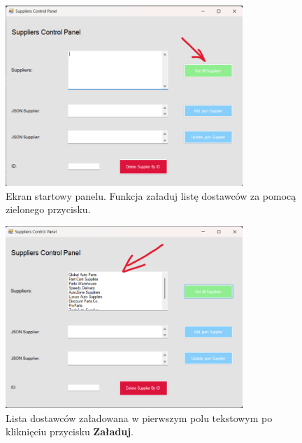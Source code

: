 \begin{figure}[h!]
    \centering
    \includegraphics[width=0.8\textwidth]{img_tests/suppliers_test_1.png}
    \caption{Ekran startowy panelu. Funkcja załaduj listę dostawców za pomocą zielonego przycisku.}
    \label{fig:suppliers_test_1}
\end{figure}

\begin{figure}[h!]
    \centering
    \includegraphics[width=0.8\textwidth]{img_tests/suppliers_test_2.png}
    \caption{Lista dostawców załadowana w pierwszym polu tekstowym po kliknięciu przycisku \textbf{Załaduj}.}
    \label{fig:suppliers_test_2}
\end{figure}

